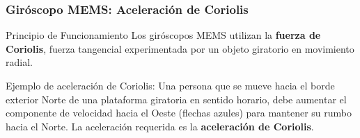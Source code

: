 \begin{frame}
    \frametitle{Giróscopo MEMS: Aceleración de Coriolis}
    \footnotesize
    
    \begin{figure}
        \hspace{2em}
        \hspace{2em}
    \end{figure}
    
    \begin{block}{Principio de Funcionamiento}
        Los giróscopos MEMS utilizan la \textbf{fuerza de Coriolis}, fuerza tangencial experimentada por un objeto giratorio en movimiento radial.
    \end{block}

    Ejemplo de aceleración de Coriolis:
    Una persona que se mueve hacia el borde exterior Norte de una plataforma giratoria en sentido horario, debe aumentar el componente de velocidad hacia el Oeste (flechas azules) para mantener su rumbo hacia el Norte. La aceleración requerida es la \textbf{aceleración de Coriolis}.
    

\end{frame}
